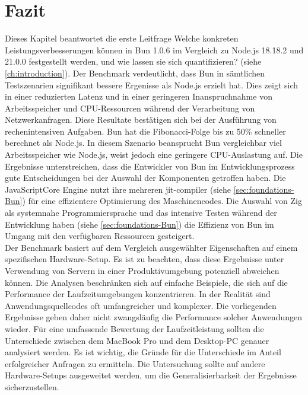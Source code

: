 \section{Fazit} \label{sec:performance-conclusion}
Dieses Kapitel beantwortet die erste Leitfrage \glqq Welche konkreten Leistungsverbesserungen können in Bun 1.0.6 im Vergleich zu Node.js 18.18.2 und 21.0.0 festgestellt werden, und wie lassen sie sich quantifizieren?\grqq{} (siehe \autoref{ch:introduction}). Der Benchmark verdeutlicht, dass Bun in sämtlichen Testszenarien signifikant bessere Ergenisse als Node.js erzielt hat. Dies zeigt sich in einer reduzierten Latenz und in einer geringeren Inanspruchnahme von Arbeitsspeicher und CPU-Ressourcen während der Verarbeitung von Netzwerkanfragen. Diese Resultate bestätigen sich bei der Ausführung von rechenintensiven Aufgaben. Bun hat die Fibonacci-Folge bis zu 50\% schneller berechnet als Node.js. In diesem Szenario beansprucht Bun vergleichbar viel Arbeitsspeicher wie Node.js, weist jedoch eine geringere CPU-Auslastung auf. \newline
Die Ergebnisse unterstreichen, dass die Entwickler von Bun im Entwicklungsprozess gute Entscheidungen bei der Auswahl der Komponenten getroffen haben. Die JavaScriptCore Engine nutzt ihre mehreren \ac{jit-compiler} (siehe \autoref{sec:foundations-Bun}) für eine effizientere Optimierung des Maschinencodes. Die Auswahl von Zig als systemnahe Programmiersprache und das intensive Testen während der Entwicklung haben (siehe \autoref{sec:foundations-Bun}) die Effizienz von Bun im Umgang mit den verfügbaren Ressourcen gesteigert.\\

\noindent
Der Benchmark basiert auf dem Vergleich ausgewählter Eigenschaften auf einem spezifischen Hardware-Setup. Es ist zu beachten, dass diese Ergebnisse unter Verwendung von Servern in einer Produktivumgebung potenziell abweichen können. Die Analysen beschränken sich auf einfache Beispiele, die sich auf die Performance der Laufzeitumgebungen konzentrieren. In der Realität sind Anwendungsquellcodes oft umfangreicher und komplexer. Die vorliegenden Ergebnisse geben daher nicht zwangsläufig die Performance solcher Anwendungen wieder. Für eine umfassende Bewertung der Laufzeitleistung sollten die Unterschiede zwischen dem MacBook Pro und dem Desktop-PC genauer analysiert werden. Es ist wichtig, die Gründe für die Unterschiede im Anteil erfolgreicher Anfragen zu ermitteln. Die Untersuchung sollte auf andere Hardware-Setups ausgeweitet werden, um die Generalisierbarkeit der Ergebnisse sicherzustellen.